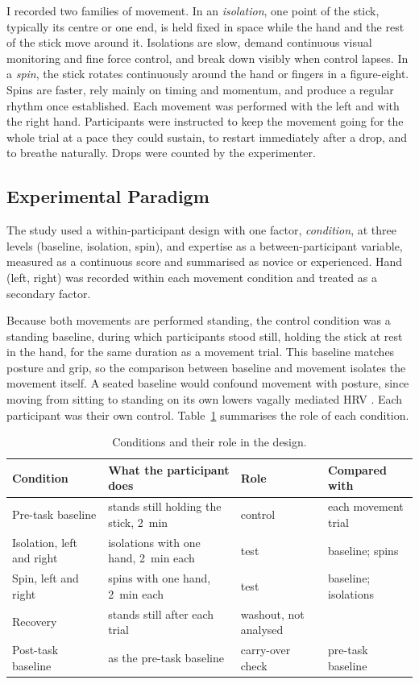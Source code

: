 I recorded two families of movement. In an \emph{isolation}, one point of the stick, typically its centre or one end, is held fixed in space while the hand and the rest of the stick move around it. Isolations are slow, demand continuous visual monitoring and fine force control, and break down visibly when control lapses. In a \emph{spin}, the stick rotates continuously around the hand or fingers in a figure-eight. Spins are faster, rely mainly on timing and momentum, and produce a regular rhythm once established. Each movement was performed with the left and with the right hand. Participants were instructed to keep the movement going for the whole trial at a pace they could sustain, to restart immediately after a drop, and to breathe naturally. Drops were counted by the experimenter.

\subsection{Experimental Paradigm}
\label{sec:paradigm}

The study used a within-participant design with one factor, \emph{condition}, at three levels (baseline, isolation, spin), and expertise as a between-participant variable, measured as a continuous score and summarised as novice or experienced. Hand (left, right) was recorded within each movement condition and treated as a secondary factor.

Because both movements are performed standing, the control condition was a standing baseline, during which participants stood still, holding the stick at rest in the hand, for the same duration as a movement trial. This baseline matches posture and grip, so the comparison between baseline and movement isolates the movement itself. A seated baseline would confound movement with posture, since moving from sitting to standing on its own lowers vagally mediated HRV \citep{laborde2017}. Each participant was their own control. Table~\ref{tab:conditions} summarises the role of each condition.

\begin{table}[ht]
\centering
\caption{Conditions and their role in the design.}
\label{tab:conditions}
\small
\begin{tabularx}{\textwidth}{>{\raggedright\arraybackslash}p{3.2cm} X >{\raggedright\arraybackslash}p{3.0cm} >{\raggedright\arraybackslash}p{2.6cm}}
\toprule
Condition & What the participant does & Role & Compared with \\
\midrule
Pre-task baseline & stands still holding the stick, 2~min & control & each movement trial \\
Isolation, left and right & isolations with one hand, 2~min each & test & baseline; spins \\
Spin, left and right & spins with one hand, 2~min each & test & baseline; isolations \\
Recovery & stands still after each trial & washout, not analysed & \\
Post-task baseline & as the pre-task baseline & carry-over check & pre-task baseline \\
\bottomrule
\end{tabularx}
\end{table}

